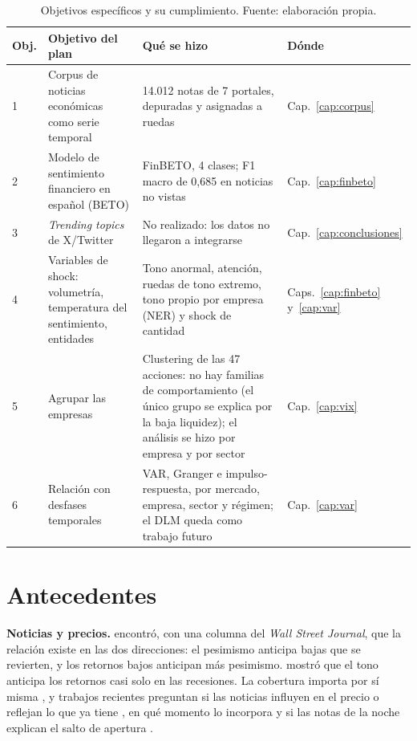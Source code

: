 \begin{table}[H]
\centering\small
\begin{tabularx}{\linewidth}{@{}C{0.6cm}L{4.6cm}YL{1.6cm}@{}}
\toprule
\textbf{Obj.} & \textbf{Objetivo del plan} & \textbf{Qué se hizo} & \textbf{Dónde} \\
 & Corpus de noticias económicas como serie temporal & 14.012 notas de 7 portales, depuradas y asignadas a ruedas & Cap.~\ref{cap:corpus} \\
2 & Modelo de sentimiento financiero en español (BETO) & FinBETO, 4 clases; F1 macro de 0,685 en noticias no vistas & Cap.~\ref{cap:finbeto} \\
3 & \textit{Trending topics} de X/Twitter & No realizado: los datos no llegaron a integrarse & Cap.~\ref{cap:conclusiones} \\
4 & Variables de shock: volumetría, temperatura del sentimiento, entidades & Tono anormal, atención, ruedas de tono extremo, tono propio por empresa (NER) y shock de cantidad & Caps.~\ref{cap:finbeto} y~\ref{cap:var} \\
5 & Agrupar las empresas & Clustering de las 47 acciones: no hay familias de comportamiento (el único grupo se explica por la baja liquidez); el análisis se hizo por empresa y por sector & Cap.~\ref{cap:vix} \\
6 & Relación con desfases temporales & VAR, Granger e impulso-respuesta, por mercado, empresa, sector y régimen; el DLM queda como trabajo futuro & Cap.~\ref{cap:var} \\
\bottomrule
\end{tabularx}
\caption{Objetivos específicos y su cumplimiento. Fuente: elaboración propia.}
\label{tab:objetivos}
\end{table}

\section{Antecedentes}
\label{sec:antecedentes}

\textbf{Noticias y precios.} \citet{tetlock2007} encontró, con una columna del \textit{Wall
Street Journal}, que la relación existe en las dos direcciones: el pesimismo anticipa bajas que
se revierten, y los retornos bajos anticipan más pesimismo. \citet{garcia2013} mostró que el
tono anticipa los retornos casi solo en las recesiones. La cobertura importa por sí misma
\citep{fang2009,engelberg2011}, y trabajos recientes preguntan si las noticias influyen en el
precio o reflejan lo que ya tiene \citep{verma2026}, en qué momento lo incorpora
\citep{kargarzadeh2026} y si las notas de la noche explican el salto de apertura
\citep{glasserman2025}.

